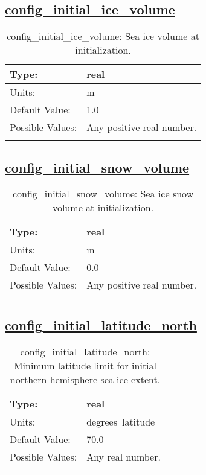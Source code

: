 \subsection[config\_initial\_ice\_volume]{\hyperref[sec:nm_tab_initialize]{config\_initial\_ice\_volume}}
\label{subsec:nm_sec_config_initial_ice_volume}
\begin{center}
\begin{longtable}{| p{2.0in} || p{4.0in} |}
    \hline
    Type: & real \\
    \hline
    Units: & \si{m} \\
    \hline
    Default Value: & 1.0 \\
    \hline
    Possible Values: & Any positive real number. \\
    \hline
    \caption{config\_initial\_ice\_volume: Sea ice volume at initialization.}
\end{longtable}
\end{center}
\subsection[config\_initial\_snow\_volume]{\hyperref[sec:nm_tab_initialize]{config\_initial\_snow\_volume}}
\label{subsec:nm_sec_config_initial_snow_volume}
\begin{center}
\begin{longtable}{| p{2.0in} || p{4.0in} |}
    \hline
    Type: & real \\
    \hline
    Units: & \si{m} \\
    \hline
    Default Value: & 0.0 \\
    \hline
    Possible Values: & Any positive real number. \\
    \hline
    \caption{config\_initial\_snow\_volume: Sea ice snow volume at initialization.}
\end{longtable}
\end{center}
\subsection[config\_initial\_latitude\_north]{\hyperref[sec:nm_tab_initialize]{config\_initial\_latitude\_north}}
\label{subsec:nm_sec_config_initial_latitude_north}
\begin{center}
\begin{longtable}{| p{2.0in} || p{4.0in} |}
    \hline
    Type: & real \\
    \hline
    Units: & \si{degrees.latitude} \\
    \hline
    Default Value: & 70.0 \\
    \hline
    Possible Values: & Any real number. \\
    \hline
    \caption{config\_initial\_latitude\_north: Minimum latitude limit for initial northern hemisphere sea ice extent.}
\end{longtable}
\end{center}
